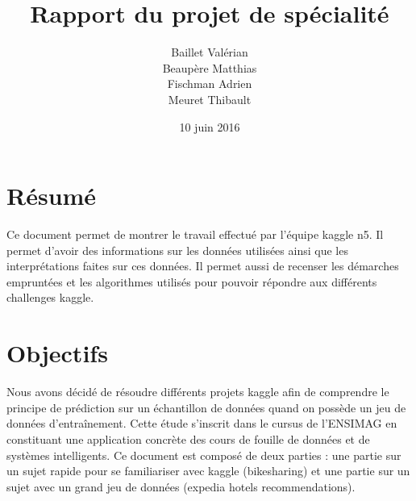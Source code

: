 \documentclass[12pt,a4paper]{article} %
\title{Rapport du projet de spécialité}
\author{Baillet Valérian\\Beaupère Matthias\\Fischman Adrien\\Meuret Thibault}
\date{10 juin 2016} %
\begin{document}
\maketitle

\newpage
\tableofcontents

\newpage

\section{Résumé}
Ce document permet de montrer le travail effectué par l'équipe kaggle n5. Il permet d'avoir des informations sur les données utilisées ainsi que les interprétations faites sur ces données. Il permet aussi de recenser les démarches empruntées et les algorithmes utilisés pour pouvoir répondre aux différents challenges kaggle.

\section{Objectifs}
Nous avons décidé de résoudre différents projets kaggle afin de comprendre le principe de prédiction sur un échantillon de données quand on possède un jeu de données d’entraînement. Cette étude s'inscrit dans le cursus de l'ENSIMAG en constituant une application concrète des cours de fouille de données et de systèmes intelligents. Ce document est composé de deux parties : une partie sur un sujet rapide pour se familiariser avec kaggle (bikesharing) et une partie sur un sujet avec un grand jeu de données (expedia hotels recommendations).
\end{document}

